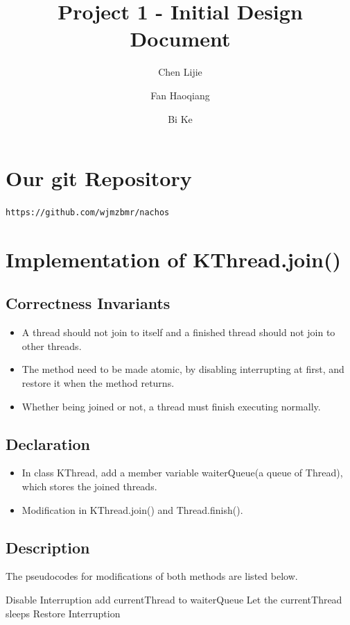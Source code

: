\documentclass{article}
\title{Project 1 - Initial Design Document}
\author{Chen Lijie\\ \and
	Fan Haoqiang\\ \and
	Bi Ke\\ }
\date{}
\begin{document}
	\maketitle
	\tableofcontents
	\section{Our git Repository}
	\texttt{https://github.com/wjmzbmr/nachos}
	\section{Implementation of KThread.join()}
	
	\subsection{Correctness Invariants}
	
	\begin{itemize}
		\item A thread should not join to itself and a finished thread should not join to other threads.
		\item The method need to be made atomic, by disabling interrupting at first, and restore it when the method returns.
		\item Whether being joined or not, a thread must finish executing normally.
	\end{itemize}

	\subsection{Declaration}
	\begin{itemize}
		\item In class KThread, add a member variable waiterQueue(a queue of Thread), which stores the joined threads.
		
		\item Modification in KThread.join() and Thread.finish().
    \end{itemize}
	
	\subsection{Description}
	
	The pseudocodes for modifications of both methods are listed below.
	
	\begin{algorithm}[H]
		\begin{algorithmic}
   				\State Disable Interruption
					\State add currentThread to waiterQueue
					\State Let the currentThread sleeps
				\EndIf
				\State Restore Interruption
			\EndProcedure
		\end{algorithmic}
	\end{algorithm}
	
\end{document}
